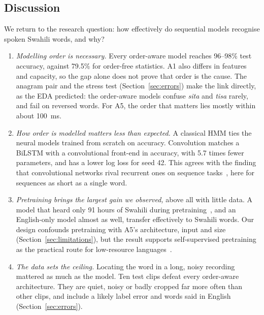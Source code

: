 \subsection{Discussion}
We return to the research question: how effectively do sequential models recognise spoken Swahili words, and why?
\begin{enumerate}
  \item \emph{Modelling order is necessary.} Every order-aware model reaches 96--98\% test accuracy, against 79.5\%
        for order-free statistics. A1 also differs in features and capacity, so the gap alone does not prove that
        order is the cause. The anagram pair and the stress test (Section~\ref{sec:errors}) make the link directly,
        as the EDA predicted: the order-aware models confuse \textit{sita} and \textit{tisa} rarely, and fail on
        reversed words. For A5, the order that matters lies mostly within about 100~ms.
  \item \emph{How order is modelled matters less than expected.} A classical HMM ties the neural models trained from
        scratch on accuracy. Convolution matches a BiLSTM with a convolutional front-end in accuracy, with 5.7 times
        fewer parameters, and has a lower log loss for seed 42. This agrees with the finding that convolutional
        networks rival recurrent ones on sequence tasks~\cite{bai2018empirical}, here for sequences as short as a
        single word.
  \item \emph{Pretraining brings the largest gain we observed,} above all with little data. A model that heard only
        91 hours of Swahili during pretraining~\cite{babu2022xlsr}, and an English-only model almost as well,
        transfer effectively to Swahili words. Our design confounds pretraining with A5's architecture, input and
        size (Section~\ref{sec:limitations}), but the result supports self-supervised pretraining as the practical
        route for low-resource languages~\cite{baevski2020wav2vec,doumbouya2021using}.
  \item \emph{The data sets the ceiling.} Locating the word in a long, noisy recording mattered as much as the
        model. Ten test clips defeat every order-aware architecture. They are quiet, noisy or badly cropped far more
        often than other clips, and include a likely label error and words said in English
        (Section~\ref{sec:errors}).
\end{enumerate}
